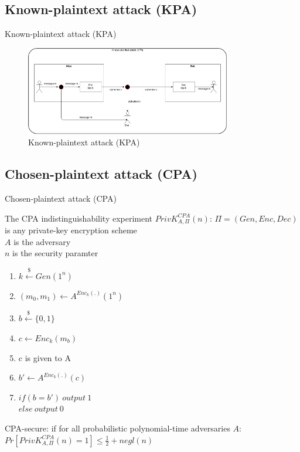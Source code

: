 \documentclass[ucs,9pt]{beamer}
\begin{document}
\subsection{Known-plaintext attack (KPA)}
    
\begin{frame}{Known-plaintext attack (KPA)}
    
    \begin{figure}[h]
        \centering
        \includegraphics[width=0.8\textwidth]{figures/KPA.png}
        \caption{Known-plaintext attack (KPA)}
    \end{figure}
\end{frame}


\subsection{Chosen-plaintext attack (CPA)}

\begin{frame}{Chosen-plaintext attack (CPA)}
    \begin{block}{The CPA indistinguishability experiment $PrivK_{A,\Pi}^{CPA}(n)$:}
        $\Pi = (Gen, Enc, Dec)$ is any private-key encryption scheme\\
        $A$ is the adversary\\
        $n$ is the security paramter\\
        
        \begin{enumerate}
            \item $k \overset{\$}{\leftarrow} Gen(1^n)$
            \item $(m_{0},m_{1}) \leftarrow A^{Enc_{k}(.)}(1^{n})$
            \item $b \overset{\$}{\leftarrow} \{0,1\}$
            \item $c \leftarrow Enc_{k}(m_{b})$
            \item c is given to A
            \item $b' \leftarrow A^{Enc_{k}(.)}(c)$
            \item $if(b = b')\ output\ 1$ \\
            $else\ output\ 0$
        \end{enumerate}
        
        CPA-secure: if for all probabilistic polynomial-time adversaries $A$:\\
        $Pr[PrivK_{A,\Pi}^{CPA}(n) = 1] \leq \frac{1}{2} + negl(n)$
    \end{block}
\end{frame}
\end{document}
